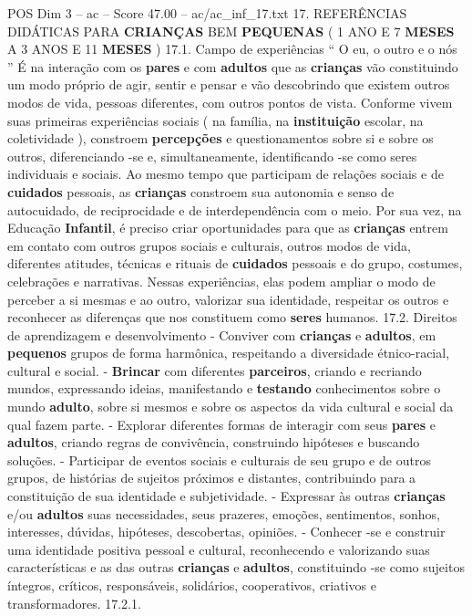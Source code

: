 \begin{textsample}{POS Dim 3 – ac – Score 47.00 – ac/ac\_inf\_17.txt}  \label{ex:f3_pos_030}
17.
REFERÊNCIAS DIDÁTICAS PARA \textbf{CRIANÇAS} BEM \textbf{PEQUENAS} ( 1 ANO E 7 \textbf{MESES} A 3 ANOS E 11 \textbf{MESES} ) 17.1.
Campo de experiências “ O eu, o outro e o nós ” É na interação com os \textbf{pares} e com \textbf{adultos} que as \textbf{crianças} vão constituindo um modo próprio de agir, sentir e pensar e vão descobrindo que existem outros modos de vida, pessoas diferentes, com outros pontos de vista.
Conforme vivem suas primeiras experiências sociais ( na família, na \textbf{instituição} escolar, na coletividade ), constroem \textbf{percepções} e questionamentos sobre si e sobre os outros, diferenciando -se e, simultaneamente, identificando -se como seres individuais e sociais.
Ao mesmo tempo que participam de relações sociais e de \textbf{cuidados} pessoais, as \textbf{crianças} constroem sua autonomia e senso de autocuidado, de reciprocidade e de interdependência com o meio.
Por sua vez, na Educação \textbf{Infantil}, é preciso criar oportunidades para que as \textbf{crianças} entrem em contato com outros grupos sociais e culturais, outros modos de vida, diferentes atitudes, técnicas e rituais de \textbf{cuidados} pessoais e do grupo, costumes, celebrações e narrativas.
Nessas experiências, elas podem ampliar o modo de perceber a si mesmas e ao outro, valorizar sua identidade, respeitar os outros e reconhecer as diferenças que nos constituem como \textbf{seres} humanos. 17.2.
Direitos de aprendizagem e desenvolvimento - Conviver com \textbf{crianças} e \textbf{adultos}, em \textbf{pequenos} grupos de forma harmônica, respeitando a diversidade étnico-racial, cultural e social. - \textbf{Brincar} com diferentes \textbf{parceiros}, criando e recriando mundos, expressando ideias, manifestando e \textbf{testando} conhecimentos sobre o mundo \textbf{adulto}, sobre si mesmos e sobre os aspectos da vida cultural e social da qual fazem parte. - Explorar diferentes formas de interagir com seus \textbf{pares} e \textbf{adultos}, criando regras de convivência, construindo hipóteses e buscando soluções. - Participar de eventos sociais e culturais de seu grupo e de outros grupos, de histórias de sujeitos próximos e distantes, contribuindo para a constituição de sua identidade e subjetividade. - Expressar às outras \textbf{crianças} e/ou \textbf{adultos} suas necessidades, seus prazeres, emoções, sentimentos, sonhos, interesses, dúvidas, hipóteses, descobertas, opiniões. - Conhecer -se e construir uma identidade positiva pessoal e cultural, reconhecendo e valorizando suas características e as das outras \textbf{crianças} e \textbf{adultos}, constituindo -se como sujeitos íntegros, críticos, responsáveis, solidários, cooperativos, criativos e transformadores. 17.2.1.

\end{textsample}
